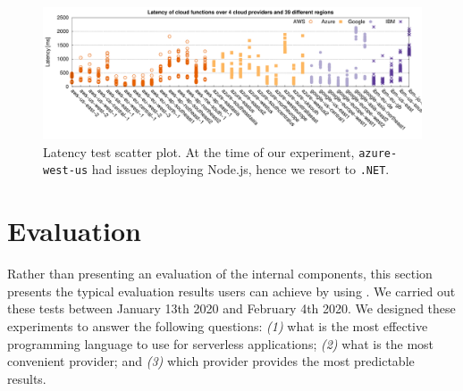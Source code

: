 

\begin{figure}[!t]
\centering
\includegraphics[width=1.0\textwidth]{bilder/latency/latency.pdf}
\caption{Latency test scatter plot. At the time of our experiment, \texttt{azure-west-us}  had issues deploying Node.js, hence we resort to \texttt{.NET}.}
\label{fig:latency_plot}
\end{figure}

\section{Evaluation}
\label{sec:evaluation}
Rather than presenting an evaluation of the \sys internal components, this section presents the typical evaluation results users can achieve by using \sys.
We carried out these tests between January 13th 2020 and February 4th 2020.
We designed these experiments to answer the following questions: 
\emph{(1)} what is the most effective programming language to use for serverless applications;
\emph{(2)} what is the most convenient provider; 
and \emph{(3)} which provider provides the most predictable results.

%


